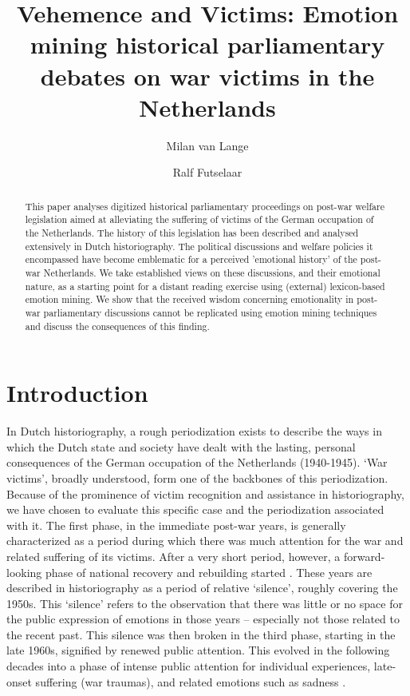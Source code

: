 \documentclass{dhbenelux}
\author[1, 2]{Milan van Lange}
\author[1, 3]{Ralf Futselaar}
\affil[1]{NIOD Institute for War, Holocaust, and Genocide Studies}
\affil[2]{Utrecht University}
\affil[3]{Erasmus University Rotterdam}
\title{Vehemence and Victims: Emotion mining historical parliamentary debates on war victims in the Netherlands}
\begin{document}
\maketitle
\begin{abstract}This paper analyses digitized historical parliamentary proceedings on post-war welfare legislation aimed at alleviating the suffering of victims of the German occupation of the Netherlands. The history of this legislation has been described and analysed extensively in Dutch historiography. The political discussions and welfare policies it encompassed have become emblematic for a perceived 'emotional history' of the post-war Netherlands. We take established views on these discussions, and their emotional nature, as a starting point for a distant reading exercise using (external) lexicon-based emotion mining. We show that the received wisdom concerning emotionality in post-war parliamentary discussions cannot be replicated using emotion mining techniques and discuss the consequences of this finding.
\end{abstract}

\thispagestyle{papertitlepage} 

\section{Introduction}

In Dutch historiography, a rough periodization exists to describe the ways in which the Dutch state and society have dealt with the lasting, personal consequences of the German occupation of the Netherlands (1940-1945). ‘War victims’, broadly understood, form one of the backbones of this periodization. Because of the prominence of victim recognition and assistance in historiography, we have chosen to evaluate this specific case and the periodization associated with it. The first phase, in the immediate post-war years, is generally characterized as a period during which there was much attention for the war and related suffering of its victims. After a very short period, however, a forward-looking phase of national recovery and rebuilding started \citep{blom_jaren_1981}. These years are described in historiography as a period of relative ‘silence’, roughly covering the 1950s. This ‘silence’ refers to the observation that there was little or no space for the public expression of emotions in those years – especially not those related to the recent past. This silence was then broken in the third phase, starting in the late 1960s, signified by renewed public attention. This evolved in the following decades into a phase of intense public attention for individual experiences, late-onset suffering (war traumas), and related emotions such as sadness \citep{withuis_erkenning._2002, beunders_publieke_2002, baalen_emotie_2003, oosterhuis_mental_2014, kosaka_victims_2008}. 
\end{document}
